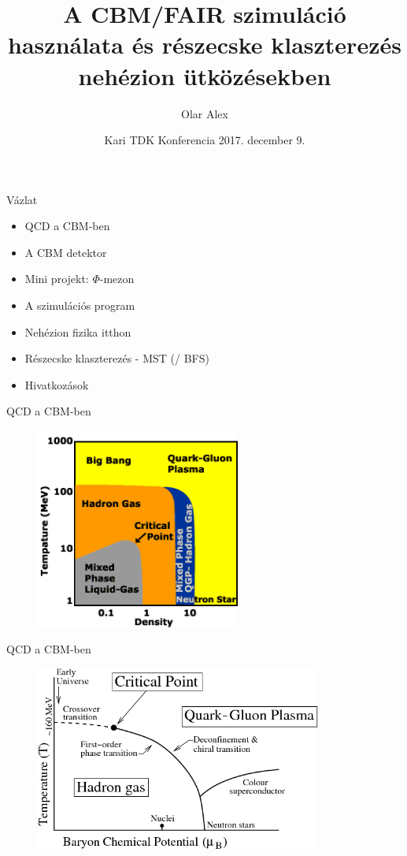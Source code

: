 \documentclass[10pt]{beamer}
\author{Olar Alex}
\title{A CBM/FAIR szimuláció használata és részecske klaszterezés nehézion ütközésekben}
\institute{Eötvös Loránd Tudományegyetem \\ \scriptsize{Fizika BSc III.}}
\date{Kari TDK Konferencia 2017. december 9.}
\begin{document}
\begin{frame}[t,plain]
\titlepage
\end{frame}

\begin{frame}[t]{Vázlat}
\begin{itemize}
\item QCD a CBM-ben
\item A CBM detektor
\item Mini projekt: $\Phi$-mezon
\item A szimulációs program
\item Nehézion fizika itthon
\item Részecske klaszterezés - MST (/ BFS)
\item Hivatkozások
\end{itemize}
\end{frame}

\begin{frame}[t]{QCD a CBM-ben}
\begin{figure}[H!]
\centering
\includegraphics[width=0.6\textwidth]{../latex/cbm_phase1.png}
\end{figure}
\end{frame}

\begin{frame}[t]{QCD a CBM-ben}
\begin{figure}[H!]
\centering
\includegraphics[width=0.84\textwidth]{../latex/CBM_phase_trans.png}
\end{figure}
\end{frame}
\end{document}

